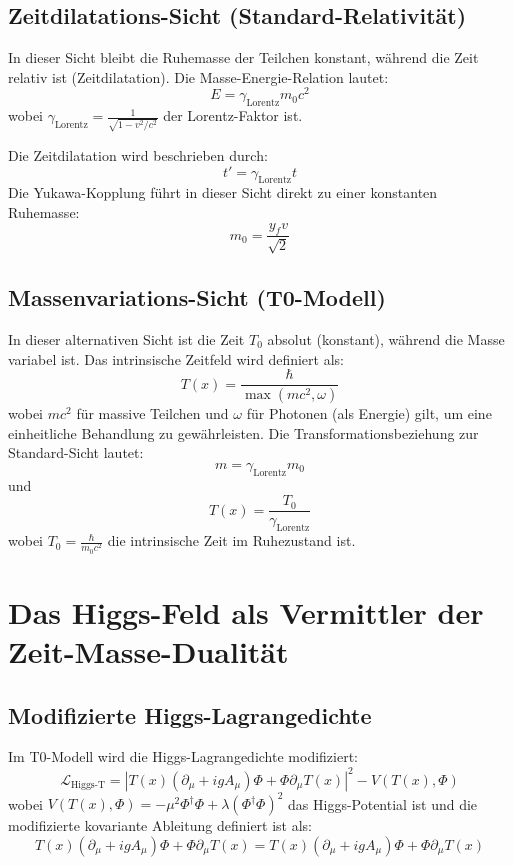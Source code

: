 \documentclass[a4paper,12pt]{article}
\newcommand{\Tfield}{T(x)}
\newcommand{\Tzero}{T_0}
\newcommand{\DhiggsT}{\Tfield (\partial_\mu + ig A_\mu) \Phi + \Phi \partial_\mu \Tfield}
\newcommand{\gammaf}{\gamma_{\text{Lorentz}}}
\begin{document}
	\subsection{Zeitdilatations-Sicht (Standard-Relativität)}
	In dieser Sicht bleibt die Ruhemasse der Teilchen konstant, während die Zeit relativ ist (Zeitdilatation). Die Masse-Energie-Relation lautet:
	\begin{equation}
		E = \gammaf m_0 c^2
	\end{equation}
	wobei \( \gammaf = \frac{1}{\sqrt{1-v^2/c^2}} \) der Lorentz-Faktor ist.
	
	Die Zeitdilatation wird beschrieben durch:
	\begin{equation}
		t' = \gammaf t
	\end{equation}
	Die Yukawa-Kopplung führt in dieser Sicht direkt zu einer konstanten Ruhemasse:
	\begin{equation}
		m_0 = \frac{y_f v}{\sqrt{2}}
	\end{equation}
	
	\subsection{Massenvariations-Sicht (T0-Modell)}
	In dieser alternativen Sicht ist die Zeit \( \Tzero \) absolut (konstant), während die Masse variabel ist. Das intrinsische Zeitfeld wird definiert als:
	\begin{equation}
		\Tfield = \frac{\hbar}{\max(m c^2, \omega)}
	\end{equation}
	wobei \( m c^2 \) für massive Teilchen und \( \omega \) für Photonen (als Energie) gilt, um eine einheitliche Behandlung zu gewährleisten. Die Transformationsbeziehung zur Standard-Sicht lautet:
	\begin{equation}
		m = \gammaf m_0
	\end{equation}
	und
	\begin{equation}
		\Tfield = \frac{\Tzero}{\gammaf}
	\end{equation}
	wobei \( \Tzero = \frac{\hbar}{m_0 c^2} \) die intrinsische Zeit im Ruhezustand ist.
	
	\section{Das Higgs-Feld als Vermittler der Zeit-Masse-Dualität}
	\subsection{Modifizierte Higgs-Lagrangedichte}
	Im T0-Modell wird die Higgs-Lagrangedichte modifiziert:
	\begin{equation}
		\mathcal{L}_{\text{Higgs-T}} = |\DhiggsT|^2 - V(\Tfield, \Phi)
	\end{equation}
	wobei \( V(\Tfield, \Phi) = -\mu^2 \Phi^\dagger \Phi + \lambda (\Phi^\dagger \Phi)^2 \) das Higgs-Potential ist und die modifizierte kovariante Ableitung definiert ist als:
	\begin{equation}
		\DhiggsT = \Tfield (\partial_\mu + ig A_\mu) \Phi + \Phi \partial_\mu \Tfield
	\end{equation}
	
\end{document}
